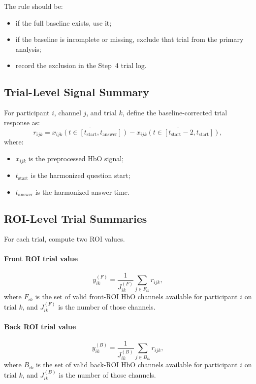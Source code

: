 The rule should be:
\begin{itemize}
    \item if the full baseline exists, use it;
    \item if the baseline is incomplete or missing, exclude that trial from the primary analysis;
    \item record the exclusion in the Step~4 trial log.
\end{itemize}

\subsection{Trial-Level Signal Summary}
For participant \(i\), channel \(j\), and trial \(k\), define the baseline-corrected trial response as:
\begin{equation}
r_{ijk}
=
\overline{x_{ijk}(t \in [t_{\mathrm{start}}, t_{\mathrm{answer}}])}
-
\overline{x_{ijk}(t \in [t_{\mathrm{start}}-2, t_{\mathrm{start}}])},
\end{equation}
where:
\begin{itemize}
    \item \(x_{ijk}\) is the preprocessed HbO signal;
    \item \(t_{\mathrm{start}}\) is the harmonized question start;
    \item \(t_{\mathrm{answer}}\) is the harmonized answer time.
\end{itemize}

\subsection{ROI-Level Trial Summaries}
For each trial, compute two ROI values.

\paragraph{Front ROI trial value}
\begin{equation}
y^{(F)}_{ik}
=
\frac{1}{J^{(F)}_{ik}}
\sum_{j \in F_{ik}} r_{ijk},
\end{equation}
where \(F_{ik}\) is the set of valid front-ROI HbO channels available for participant \(i\) on trial \(k\),
and \(J^{(F)}_{ik}\) is the number of those channels.

\paragraph{Back ROI trial value}
\begin{equation}
y^{(B)}_{ik}
=
\frac{1}{J^{(B)}_{ik}}
\sum_{j \in B_{ik}} r_{ijk},
\end{equation}
where \(B_{ik}\) is the set of valid back-ROI HbO channels available for participant \(i\) on trial \(k\),
and \(J^{(B)}_{ik}\) is the number of those channels.

